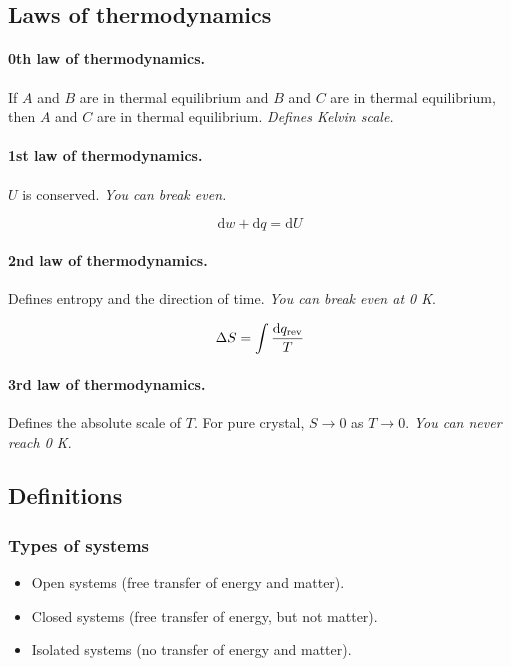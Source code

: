 \documentclass{article}
\numberwithin{theorem}{section}
\numberwithin{corollary}{section}
\numberwithin{postulate}{section}
\numberwithin{lemma}{section}
\numberwithin{definition}{section}
\begin{document}
\subsection{Laws of thermodynamics}

\paragraph{0th law of thermodynamics.} If $A$ and $B$ are in thermal equilibrium
and $B$ and $C$ are in thermal equilibrium, then $A$ and $C$ are in thermal 
equilibrium. \textit{Defines Kelvin scale.}

\paragraph{1st law of thermodynamics.} $U$ is conserved. \textit{You can break
even.}

\begin{equation}
  \mathrm{d}w + \mathrm{d}q = \mathrm{d}U
\end{equation}

\paragraph{2nd law of thermodynamics.} Defines entropy and the direction of
time. \textit{You can break even at 0 K}.

\begin{equation}
  \Delta S = \int \frac{\textnormal{d} q_{\mathrm{rev}}}{T}
\end{equation}

\paragraph{3rd law of thermodynamics.} Defines the absolute scale of $T$. For
pure crystal, $S \rightarrow 0$ as $T \rightarrow 0$. \textit{You can never
reach 0 K}.

\subsection{Definitions}

\subsubsection{Types of systems}
\begin{itemize}
  \item Open systems (free transfer of energy and matter).
  \item Closed systems (free transfer of energy, but not matter).
  \item Isolated systems (no transfer of energy and matter).
\end{itemize}
\end{document}
